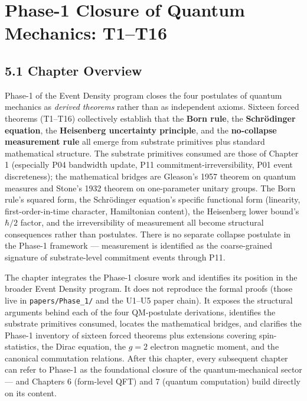 \documentclass[11pt]{book}
\begin{document}
\newpage


\chapter{Phase-1 Closure of Quantum Mechanics: T1–T16}
\label{chap:5}

\section{5.1 Chapter Overview}

Phase-1 of the Event Density program closes the four postulates of quantum mechanics as \textit{derived theorems} rather than as independent axioms. Sixteen forced theorems (T1–T16) collectively establish that the \textbf{Born rule}, the \textbf{Schrödinger equation}, the \textbf{Heisenberg uncertainty principle}, and the \textbf{no-collapse measurement rule} all emerge from substrate primitives plus standard mathematical structure. The substrate primitives consumed are those of Chapter 1 (especially P04 bandwidth update, P11 commitment-irreversibility, P01 event discreteness); the mathematical bridges are Gleason's 1957 theorem on quantum measures and Stone's 1932 theorem on one-parameter unitary groups. The Born rule's squared form, the Schrödinger equation's specific functional form (linearity, first-order-in-time character, Hamiltonian content), the Heisenberg lower bound's $\hbar/2$ factor, and the irreversibility of measurement all become structural consequences rather than postulates. There is no separate collapse postulate in the Phase-1 framework — measurement is identified as the coarse-grained signature of substrate-level commitment events through P11.

The chapter integrates the Phase-1 closure work and identifies its position in the broader Event Density program. It does not reproduce the formal proofs (those live in \texttt{papers/Phase\_1/} and the U1–U5 paper chain). It exposes the structural arguments behind each of the four QM-postulate derivations, identifies the substrate primitives consumed, locates the mathematical bridges, and clarifies the Phase-1 inventory of sixteen forced theorems plus extensions covering spin-statistics, the Dirac equation, the $g=2$ electron magnetic moment, and the canonical commutation relations. After this chapter, every subsequent chapter can refer to Phase-1 as the foundational closure of the quantum-mechanical sector — and Chapters 6 (form-level QFT) and 7 (quantum computation) build directly on its content.
\end{document}
